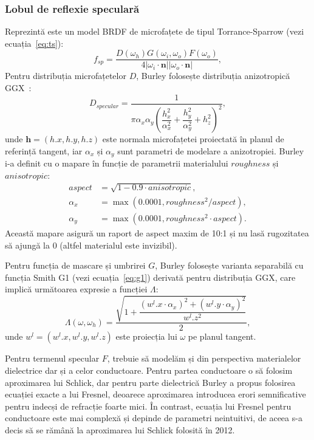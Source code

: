 \documentclass[12pt,a4paper]{report}
\numberwithin{equation}{section} %
\begin{document}
\subsubsection*{Lobul de reflexie speculară}

Reprezintă este un model BRDF de microfațete de tipul Torrance-Sparrow (vezi ecuația~\ref{eq:ts}):
\begin{equation}\label{eq:disney_specular}
	f_{sp} = \dfrac{D(\omega_h)G(\omega_i, \omega_o)F(\omega_o)}{4|\omega_i \cdot \mathbf{n} ||\omega_o \cdot \mathbf{n}|},
\end{equation}
Pentru distribuția microfațetelor $D$, Burley folosește distribuția anizotropică GGX~\cite{WalterSmithG2}:
\begin{equation}
	D_{specular} = \dfrac{1}{\pi\alpha_x\alpha_y\left(\dfrac{h_x^2}{\alpha_x^2} + \dfrac{h_y^2}{\alpha_y^2} + h_z^2\right)^2},
\end{equation}
unde $\mathbf{h} = (h.x, h.y, h.z)$ este normala microfațetei proiectată în planul de referință tangent,
iar $\alpha_x$ și $\alpha_y$ sunt parametri de modelare a anizotropiei. Burley i-a definit
cu o mapare în funcție de parametrii materialului $roughness$ și $anisotropic$:
\begin{equation}
	\begin{aligned}
		aspect   & = \sqrt{1 - 0.9\cdot anisotropic},        \\
		\alpha_x & = \max(0.0001, roughness^2 / aspect),     \\
		\alpha_y & = \max(0.0001, roughness^2 \cdot aspect).
	\end{aligned}
\end{equation}
Această mapare asigură un raport de aspect maxim de 10:1 și nu lasă rugozitatea
să ajungă la 0 (altfel materialul este invizibil).

Pentru funcția de mascare și umbrirei $G$, Burley folosește varianta separabilă cu funcția Smith G1 (vezi ecuația~\ref{eq:g1}) derivată
pentru distribuția GGX, care implică următoarea expresie a funcției $\Lambda$:
\begin{equation}\label{eq:gamma}
	\Lambda(\omega, \omega_h) = \dfrac{\sqrt{1 + \dfrac{(w^l.x\cdot \alpha_x)^2 + (w^l.y\cdot \alpha_y)^2}{w^l.z^2}}}{2},
\end{equation}
unde $w^l = (w^l.x, w^l.y, w^l.z)$ este proiecția lui $\omega$ pe planul tangent.

Pentru termenul specular $F$, trebuie să modelăm și din perspectiva materialelor
dielectrice dar și a celor conductoare. Pentru partea conductoare o să folosim
aproximarea lui Schlick, dar pentru parte dielectrică Burley a propus folosirea
ecuației exacte a lui Fresnel, deoarece aproximarea introducea erori semnificative
pentru indecși de refracție foarte mici. În contrast, ecuația lui Fresnel pentru
conductoare este mai complexă și depinde de parametri neintuitivi, de aceea
s-a decis să se rămână la aproximarea lui Schlick folosită în 2012.
\end{document}
